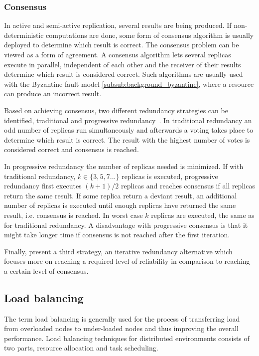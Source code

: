 \documentclass{cslthse-msc}
\begin{document}
\subsubsection{Consensus} \label{subsub:consensus}
In active and semi-active replication, several results are being produced. If non-deterministic computations are done, some form of consensus algorithm is usually deployed to determine which result is correct. The consensus problem can be viewed as a form of agreement. A consensus algorithm lets several replicas execute in parallel, independent of each other and the receiver of their results determine which result is considered correct. Such algorithms are usually used with the Byzantine fault model \cref{subsub:background_byzantine}, where a resource can produce an incorrect result.

Based on achieving consensus, two different redundancy strategies can be identified, traditional and progressive redundancy~\cite{selfAdaptRel}. In traditional redundancy an odd number of replicas run simultaneously and afterwards a voting takes place to determine which result is correct. The result with the highest number of votes is considered correct and consensus is reached.

In progressive redundancy the number of replicas needed is minimized. If with traditional redundancy, $k \in \{3,5,7...\}$ replicas is executed, progressive redundancy first executes $(k+1)/2$ replicas and reaches consensus if all replicas return the same result. If some replica return a deviant result, an additional number of replicas is executed until enough replicas have returned the same result, i.e. consensus is reached. In worst case $k$ replicas are executed, the same as for traditional redundancy. A disadvantage with progressive consensus is that it might take longer time if consensus is not reached after the first iteration.

Finally, \cite{selfAdaptRel} present a third strategy, an iterative redundancy alternative which focuses more on reaching a required level of reliability in comparison to reaching a certain level of consensus.

\subsection{Load balancing} \label{sec:background_load_balancing}
The term load balancing is generally used for the process of transferring load from overloaded nodes to under-loaded nodes and thus improving the overall performance. Load balancing techniques for distributed environments consists of two parts, resource allocation and task scheduling. 
\end{document}
